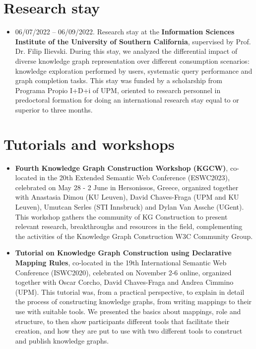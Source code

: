 \section{Research stay}
\begin{itemize}
    \item 06/07/2022 -- 06/09/2022. Research stay at the \textbf{Information Sciences Institute of the University of Southern California}, supervised by Prof. Dr. Filip Ilievski. During this stay, we analyzed the differential impact of diverse knowledge graph representation over different consumption scenarios: knowledge exploration performed by users, systematic query performance and graph completion tasks. This stay was funded by a scholarship from Programa Propio I+D+i of UPM, oriented to research personnel in predoctoral formation for doing an international research stay equal to or superior to three months.
\end{itemize}

\section{Tutorials and workshops}
\begin{itemize}
    \item \textbf{Fourth Knowledge Graph Construction Workshop (KGCW)}, co-located in the 20th Extended Semantic Web Conference (ESWC2023), celebrated on May 28 - 2 June in Hersonissos, Greece, organized together with Anastasia Dimou (KU Leuven), David Chaves-Fraga (UPM and KU Leuven), Umutcan Serles (STI Innsbruck) and Dylan Van Assche (UGent). This workshop gathers the community of KG Construction to present relevant research, breakthroughs and resources in the field, complementing the activities of the Knowledge Graph Construction W3C Community Group. 

    \item \textbf{Tutorial on Knowledge Graph Construction using Declarative Mapping Rules}, co-located in the 19th International Semantic Web Conference (ISWC2020), celebrated on November 2-6 online, organized together with Oscar Corcho, David Chaves-Fraga and Andrea Cimmino (UPM). This tutorial was, from a practical perspective, to explain in detail the process of constructing knowledge graphs, from writing mappings to their use with suitable tools. We presented the basics about mappings, role and structure, to then show participants different tools that facilitate their creation, and how they are put to use with two different tools to construct and publish knowledge graphs. 
\end{itemize}

